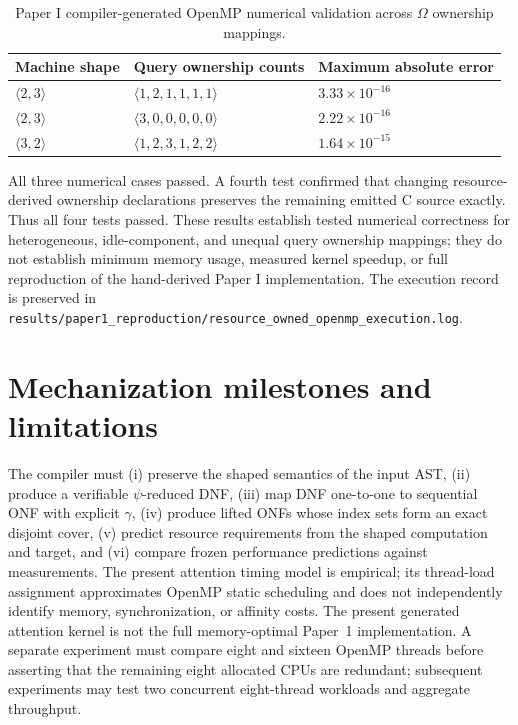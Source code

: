 \documentclass[11pt]{article}
\begin{document}
\begin{table}[htbp]
\centering
\small
\caption{Paper I compiler-generated OpenMP numerical validation across $\Omega$ ownership mappings.}
\begin{tabular}{lll}
\toprule
Machine shape & Query ownership counts & Maximum absolute error \\
\midrule
$\langle2,3\rangle$ & $\langle1,2,1,1,1,1\rangle$ & $3.33\times10^{-16}$ \\
$\langle2,3\rangle$ & $\langle3,0,0,0,0,0\rangle$ & $2.22\times10^{-16}$ \\
$\langle3,2\rangle$ & $\langle1,2,3,1,2,2\rangle$ & $1.64\times10^{-15}$ \\
\bottomrule
\end{tabular}
\end{table}

All three numerical cases passed. A fourth test confirmed that changing resource-derived ownership declarations preserves the remaining emitted C source exactly. Thus all four tests passed. These results establish tested numerical correctness for heterogeneous, idle-component, and unequal query ownership mappings; they do not establish minimum memory usage, measured kernel speedup, or full reproduction of the hand-derived Paper I implementation. The execution record is preserved in \texttt{results/paper1\_reproduction/resource\_owned\_openmp\_execution.log}.

\section{Mechanization milestones and limitations}
The compiler must (i) preserve the shaped semantics of the input AST, (ii) produce a verifiable $\psi$-reduced DNF, (iii) map DNF one-to-one to sequential ONF with explicit $\gamma$, (iv) produce lifted ONFs whose index sets form an exact disjoint cover, (v) predict resource requirements from the shaped computation and target, and (vi) compare frozen performance predictions against measurements. The present attention timing model is empirical; its thread-load assignment approximates OpenMP static scheduling and does not independently identify memory, synchronization, or affinity costs. The present generated attention kernel is not the full memory-optimal Paper~1 implementation. A separate experiment must compare eight and sixteen OpenMP threads before asserting that the remaining eight allocated CPUs are redundant; subsequent experiments may test two concurrent eight-thread workloads and aggregate throughput.
\end{document}
